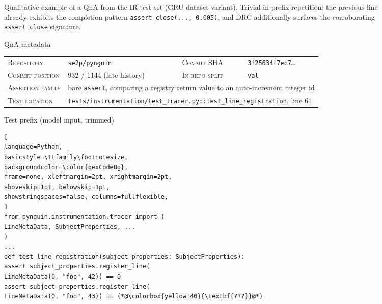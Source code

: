 \documentclass[11pt]{article}
\begin{document}
\begin{figure}[!htbp]
\begin{center}
\begin{tcolorbox}
\end{tcolorbox}
\caption{Qualitative example of a QnA from the IR test set (GRU dataset variant). Trivial in-prefix repetition: the previous line already exhibits the completion pattern \texttt{assert\_close(...,\,0.005)}, and DRC additionally surfaces the corroborating \texttt{assert\_close} signature.}
\label{fig:qualitative_ir_fla_46}
\end{center}
\end{figure}

\begin{figure}[!htbp]
\begin{center}
\begin{tcolorbox}[
enhanced,
colback=white, colframe=qexHead, coltitle=white,
fonttitle=\bfseries,
title={Detailed qualitative example: \texttt{se2p/pynguin} (IR test, commit-derived)},
arc=3pt, boxrule=0.6pt,
top=3pt, bottom=3pt, left=6pt, right=6pt,
]

\begin{qexsection}{QnA metadata}
\footnotesize
\begin{tabular}{@{}l@{\;\;}l@{\hskip 14pt}l@{\;\;}l@{}}
\textsc{Repository}      & \texttt{se2p/pynguin}                       & \textsc{Commit SHA}        & \texttt{3f25634f7ec7\ldots} \\
\textsc{Commit position} & 932 / 1144 (late history)                   & \textsc{In-repo split}     & \texttt{val} \\
\textsc{Assertion family} & \multicolumn{3}{l}{bare \texttt{assert}, comparing a registry return value to an auto-increment integer id} \\
\textsc{Test location}   & \multicolumn{3}{l}{\texttt{tests/instrumentation/test\_tracer.py::test\_line\_registration}, line 61} \\
\end{tabular}
\end{qexsection}

\begin{qexsection}{Test prefix (model input, trimmed)}
\begin{lstlisting}[
language=Python,
basicstyle=\ttfamily\footnotesize,
backgroundcolor=\color{qexCodeBg},
frame=none, xleftmargin=2pt, xrightmargin=2pt,
aboveskip=1pt, belowskip=1pt,
showstringspaces=false, columns=fullflexible,
]
from pynguin.instrumentation.tracer import (
LineMetaData, SubjectProperties, ...
)
...
def test_line_registration(subject_properties: SubjectProperties):
assert subject_properties.register_line(
LineMetaData(0, "foo", 42)) == 0
assert subject_properties.register_line(
LineMetaData(0, "foo", 43)) == (*@\colorbox{yellow!40}{\textbf{???}}@*)
\end{lstlisting}
\end{qexsection}


\end{tcolorbox}
\end{center}
\end{figure}
\end{document}
